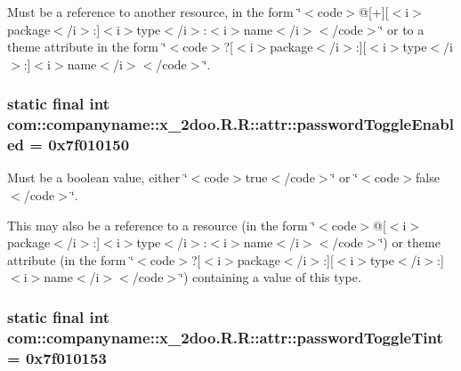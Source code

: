 Must be a reference to another resource, in the form \char`\"{}$<$code$>$@\mbox{[}+\mbox{]}\mbox{[}$<$i$>$package$<$/i$>$:\mbox{]}$<$i$>$type$<$/i$>$:$<$i$>$name$<$/i$>$$<$/code$>$\char`\"{} or to a theme attribute in the form \char`\"{}$<$code$>$?\mbox{[}$<$i$>$package$<$/i$>$:\mbox{]}\mbox{[}$<$i$>$type$<$/i$>$:\mbox{]}$<$i$>$name$<$/i$>$$<$/code$>$\char`\"{}. \hypertarget{classcom_1_1companyname_1_1x__2doo_1_1_r_1_1attr_6247e17752785ca815d31c5107e56950}{
\subsubsection[{passwordToggleEnabled}]{\setlength{\rightskip}{0pt plus 5cm}static final int com::companyname::x\_\-2doo.R.R::attr::passwordToggleEnabled = 0x7f010150}}
\label{classcom_1_1companyname_1_1x__2doo_1_1_r_1_1attr_6247e17752785ca815d31c5107e56950}


Must be a boolean value, either \char`\"{}$<$code$>$true$<$/code$>$\char`\"{} or \char`\"{}$<$code$>$false$<$/code$>$\char`\"{}. 

This may also be a reference to a resource (in the form \char`\"{}$<$code$>$@\mbox{[}$<$i$>$package$<$/i$>$:\mbox{]}$<$i$>$type$<$/i$>$:$<$i$>$name$<$/i$>$$<$/code$>$\char`\"{}) or theme attribute (in the form \char`\"{}$<$code$>$?\mbox{[}$<$i$>$package$<$/i$>$:\mbox{]}\mbox{[}$<$i$>$type$<$/i$>$:\mbox{]}$<$i$>$name$<$/i$>$$<$/code$>$\char`\"{}) containing a value of this type. \hypertarget{classcom_1_1companyname_1_1x__2doo_1_1_r_1_1attr_04391bd41d9af65d94ff433abaec0b5c}{
\subsubsection[{passwordToggleTint}]{\setlength{\rightskip}{0pt plus 5cm}static final int com::companyname::x\_\-2doo.R.R::attr::passwordToggleTint = 0x7f010153}}
\label{classcom_1_1companyname_1_1x__2doo_1_1_r_1_1attr_04391bd41d9af65d94ff433abaec0b5c}


